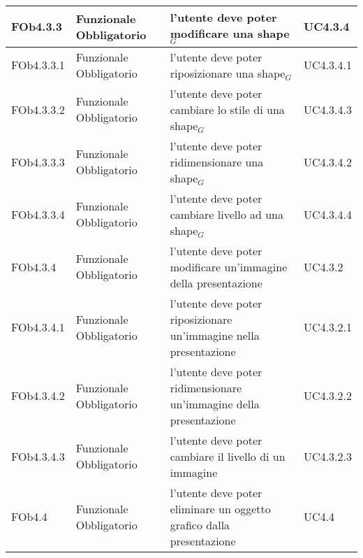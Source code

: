 \begin{longtable}{|l|p{2.5cm}|p{5cm}|p{3.5cm}|}
\hline
FOb4.3.3 & Funzionale \linebreak Obbligatorio & l'utente deve poter modificare una shape$_G$ & UC4.3.4 \linebreak  \\
\hline
FOb4.3.3.1 & Funzionale \linebreak Obbligatorio & l'utente deve poter riposizionare una shape$_G$ & UC4.3.4.1 \linebreak  \\
\hline
FOb4.3.3.2 & Funzionale \linebreak Obbligatorio & l'utente deve poter cambiare lo stile di una shape$_G$ & UC4.3.4.3 \linebreak  \\
\hline
FOb4.3.3.3 & Funzionale \linebreak Obbligatorio & l'utente deve poter ridimensionare una shape$_G$ & UC4.3.4.2 \linebreak  \\
\hline
FOb4.3.3.4 & Funzionale \linebreak Obbligatorio & l'utente deve poter cambiare livello ad una shape$_G$ & UC4.3.4.4 \linebreak  \\
\hline
FOb4.3.4 & Funzionale \linebreak Obbligatorio & l'utente deve poter modificare un'immagine della presentazione & UC4.3.2 \linebreak  \\
\hline
FOb4.3.4.1 & Funzionale \linebreak Obbligatorio & l'utente deve poter riposizionare un'immagine nella presentazione & UC4.3.2.1 \linebreak  \\
\hline
FOb4.3.4.2 & Funzionale \linebreak Obbligatorio & l'utente deve poter ridimensionare un'immagine della presentazione & UC4.3.2.2 \linebreak  \\
\hline
FOb4.3.4.3 & Funzionale \linebreak Obbligatorio & l'utente deve poter cambiare il livello di un immagine & UC4.3.2.3 \linebreak  \\
\hline
FOb4.4 & Funzionale \linebreak Obbligatorio & l'utente deve poter eliminare un oggetto grafico dalla presentazione & UC4.4 \linebreak  \\
\hline

\end{longtable}
